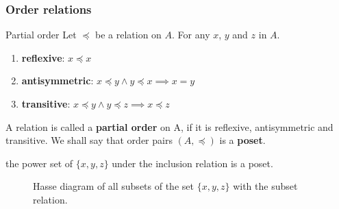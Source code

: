 \subsubsection{Order relations}

\begin{definition}{Partial order}{}
    Let $\preceq$ be a relation on $A$. For any $x$, $y$ and $z$ in $A$.
    \begin{enumerate}

        \item \textbf{reflexive}: $x \preceq x$
        \item \textbf{antisymmetric}: $x \preceq y \land y \preceq x \implies x = y$
        \item \textbf{transitive}: $x \preceq y \land y \preceq z \implies x \preceq z$

    \end{enumerate}
    A relation is called a \textbf{partial order} on A, if it is reflexive, antisymmetric and transitive. We shall say that order pairs $(A,\preceq)$ is a \textbf{poset}.
\end{definition}

\begin{examples}
    the power set of $\{x,y,z\}$ under the inclusion relation is a poset.
\end{examples}

\begin{figure}[h]
    \centering
    \caption{Hasse diagram of all subsets of the set $\{x,y,z\}$ with the subset relation.}
    \label{fig:hasse-diagram}
\end{figure}

